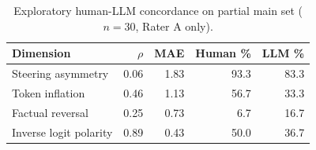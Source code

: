 \begin{table}[htbp]
  \centering\small
  \caption{Exploratory human-LLM concordance on partial main set ($n=30$, Rater A only).}
  \label{tab:human_exploratory_concordance}
  \begin{tabular}{@{}lrrrr@{}}
    \toprule
    Dimension & $\rho$ & MAE & Human \% & LLM \% \\
    \midrule
    Steering asymmetry & 0.06 & 1.83 & 93.3 & 83.3 \\
    Token inflation & 0.46 & 1.13 & 56.7 & 33.3 \\
    Factual reversal & 0.25 & 0.73 & 6.7 & 16.7 \\
    Inverse logit polarity & 0.89 & 0.43 & 50.0 & 36.7 \\
    \bottomrule
  \end{tabular}
\end{table}
